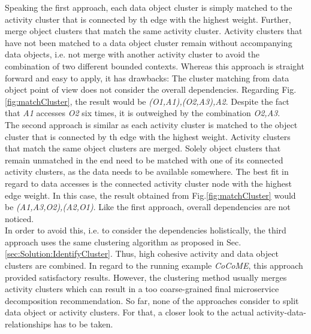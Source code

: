 Speaking the first approach, each data object cluster is simply matched to the activity cluster that is connected by th edge with the highest weight. Further, merge object clusters that match the same activity cluster. Activity clusters that have not been matched to a data object cluster remain without accompanying data objects, i.e. not merge with another activity cluster to avoid the combination of two different bounded contexts. Whereas this approach is straight forward and easy to apply, it has drawbacks: The cluster matching from data object point of view does not consider the overall dependencies. Regarding Fig.\ref{fig:matchCluster}, the result would be \textit{(O1,A1),(O2,A3),A2}. Despite the fact that \textit{A1} accesses \textit{O2} six times, it is outweighed by the combination \textit{O2,A3}.  \\
The second approach is similar as each activity cluster is matched to the object cluster that is connected by th edge with the highest weight. Activity clusters that match the same object clusters are merged. Solely object clusters that remain unmatched in the end need to be matched with one of its connected activity clusters, as the data needs to be available somewhere. The best fit in regard to data accesses is the connected activity cluster node with the highest edge weight. In this case, the result obtained from Fig.\ref{fig:matchCluster} would be \textit{(A1,A3,O2),(A2,O1)}. Like the first approach, overall dependencies are not noticed. \\
In order to avoid this, i.e. to consider the dependencies holistically, the third approach uses the same clustering algorithm as proposed in Sec.\ref{sec:Solution:IdentifyCluster}. Thus, high cohesive activity and data object clusters are combined. In regard to the running example \textit{CoCoME}, this approach provided satisfactory results. However, the clustering method usually merges activity clusters which can result in a too coarse-grained final microservice decomposition recommendation. So far, none of the approaches consider to split data object or activity clusters. For that, a closer look to the actual activity-data-relationships has to be taken. \\
